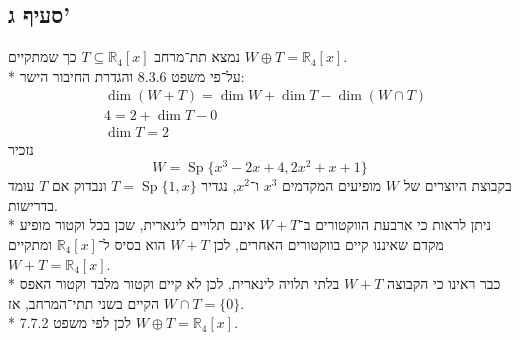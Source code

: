 \documentclass[a4paper]{article}
\DeclareMathOperator\Sp{Sp}
\def\RR{\mathbb{R}}
\begin{document}
\subsection{סעיף ג'}
נמצא תת־מרחב $T \subseteq \RR_4[x]$
כך שמתקיים $W \oplus T = \RR_4[x]$. \\*
על־פי משפט 8.3.6 והגדרת החיבור הישר:
\[
	\begin{aligned}
		& \dim(W + T) = \dim W + \dim T - \dim (W \cap T) \\
		& 4 = 2 + \dim T - 0 \\
		& \dim T = 2
	\end{aligned}
\]
נזכיר
\[
	W = \Sp\{x^3 - 2x + 4, 2x^2 + x + 1\}
\]
בקבוצת היוצרים של $W$ מופיעים המקדמים $x^3$ ו־$x^2$,
נגדיר $T = \Sp\{1, x\}$ ונבדוק אם $T$ עומד בדרישות. \\*
ניתן לראות כי ארבעת הווקטורים ב־$W + T$ אינם תלויים לינארית,
שכן בכל וקטור מופיע מקדם שאיננו קיים בווקטורים האחרים,
לכן $W + T$ הוא בסיס ל־$\RR_4[x]$ ומתקיים $W + T = \RR_4[x]$. \\*
כבר ראינו כי הקבוצה $W + T$ בלתי תלויה לינארית,
לכן לא קיים וקטור מלבד וקטור האפס הקיים בשני תתי־המרחב,
אז $W \cap T = \{0\}$. \\*
לכן לפי משפט 7.7.2 $W \oplus T = \RR_4[x]$.
\end{document}
